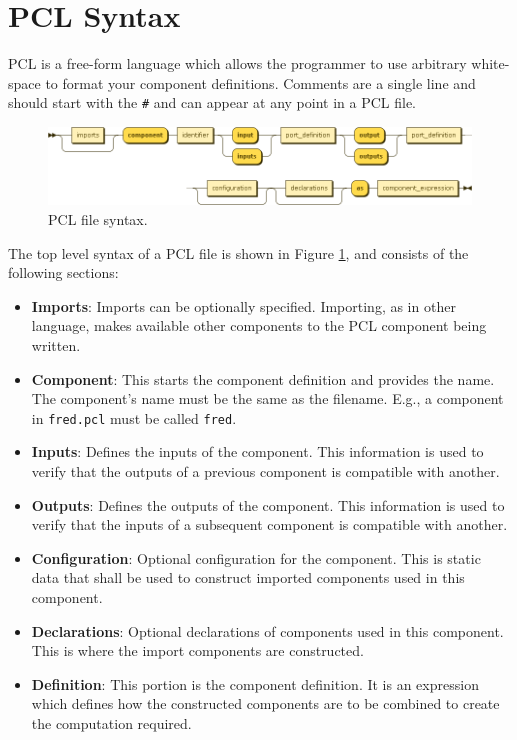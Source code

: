 \section{PCL Syntax}
PCL is a free-form language which allows the programmer to use arbitrary white-space to format your component definitions. Comments are a single line and should start with the \texttt{\#} and can appear at any point in a PCL file.
\begin{figure}[h!]
  \centering
    \includegraphics[scale=\DiagramScale,angle=90]{chapters/compiler/diagrams/component}
  \caption{PCL file syntax.}
  \label{fig:pcl-top-level}
\end{figure}
The top level syntax of a PCL file is shown in Figure \ref{fig:pcl-top-level}, and consists of the following sections:
\begin{itemize}
\item \textbf{Imports}: Imports can be optionally specified. Importing, as in other language, makes available other components to the PCL component being written.
\item \textbf{Component}: This starts the component definition and provides the name. The component's name must be the same as the filename. E.g., a component in \texttt{fred.pcl} must be called \texttt{fred}.
\item \textbf{Inputs}: Defines the inputs of the component. This information is used to verify that the outputs of a previous component is compatible with another.
\item \textbf{Outputs}: Defines the outputs of the component. This information is used to verify that the inputs of a subsequent component is compatible with another.
\item \textbf{Configuration}: Optional configuration for the component. This is static data that shall be used to construct imported components used in this component. 
\item \textbf{Declarations}: Optional declarations of components used in this component. This is where the import components are constructed.
\item \textbf{Definition}: This portion is the component definition. It is an expression which defines how the constructed components are to be combined to create the computation required.
\end{itemize}

